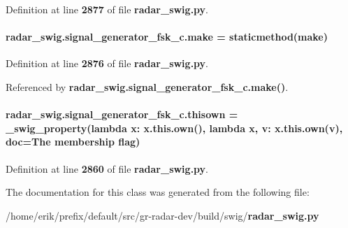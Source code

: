 Definition at line {\bf 2877} of file {\bf radar\+\_\+swig.\+py}.

\paragraph[{make}]{\setlength{\rightskip}{0pt plus 5cm}radar\+\_\+swig.\+signal\+\_\+generator\+\_\+fsk\+\_\+c.\+make = staticmethod(make)\hspace{0.3cm}{\ttfamily [static]}}\label{classradar__swig_1_1signal__generator__fsk__c_a16c46574ed5d31f393ab9e480641252e}


Definition at line {\bf 2876} of file {\bf radar\+\_\+swig.\+py}.



Referenced by {\bf radar\+\_\+swig.\+signal\+\_\+generator\+\_\+fsk\+\_\+c.\+make()}.

\paragraph[{thisown}]{\setlength{\rightskip}{0pt plus 5cm}radar\+\_\+swig.\+signal\+\_\+generator\+\_\+fsk\+\_\+c.\+thisown = {\bf \+\_\+swig\+\_\+property}(lambda x\+: x.\+this.\+own(), lambda {\bf x}, v\+: x.\+this.\+own(v), doc=\textquotesingle{}The membership flag\textquotesingle{})\hspace{0.3cm}{\ttfamily [static]}}\label{classradar__swig_1_1signal__generator__fsk__c_a9b388ff755aa04fa4e3bc697704ef7ec}


Definition at line {\bf 2860} of file {\bf radar\+\_\+swig.\+py}.



The documentation for this class was generated from the following file\+:\begin{DoxyCompactItemize}
\item 
/home/erik/prefix/default/src/gr-\/radar-\/dev/build/swig/{\bf radar\+\_\+swig.\+py}\end{DoxyCompactItemize}
